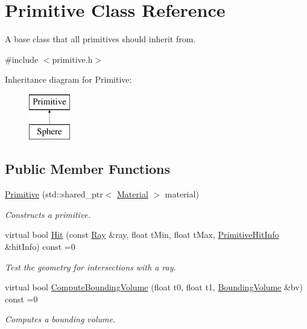 \hypertarget{class_primitive}{}\section{Primitive Class Reference}
\label{class_primitive}


A base class that all primitives should inherit from.  




{\ttfamily \#include $<$primitive.\+h$>$}

Inheritance diagram for Primitive\+:\begin{figure}[H]
\begin{center}
\leavevmode
\includegraphics[height=2.000000cm]{class_primitive}
\end{center}
\end{figure}
\subsection*{Public Member Functions}
\begin{DoxyCompactItemize}
\item 
\mbox{\hyperlink{class_primitive_ad3472a19a06d276e0f0a52ba96b8928b}{Primitive}} (std\+::shared\+\_\+ptr$<$ \mbox{\hyperlink{class_material}{Material}} $>$ material)
\begin{DoxyCompactList}\small\item\em Constructs a primitive. \end{DoxyCompactList}\item 
virtual bool \mbox{\hyperlink{class_primitive_a9a9dff3376d27201ee2fb984f03cb3bc}{Hit}} (const \mbox{\hyperlink{class_ray}{Ray}} \&ray, float t\+Min, float t\+Max, \mbox{\hyperlink{struct_primitive_hit_info}{Primitive\+Hit\+Info}} \&hit\+Info) const =0
\begin{DoxyCompactList}\small\item\em Test the geometry for intersections with a ray. \end{DoxyCompactList}\item 
virtual bool \mbox{\hyperlink{class_primitive_aa69e801685785a9ffdb7653013bf2775}{Compute\+Bounding\+Volume}} (float t0, float t1, \mbox{\hyperlink{class_bounding_volume}{Bounding\+Volume}} \&bv) const =0
\begin{DoxyCompactList}\small\item\em Computes a bounding volume. \end{DoxyCompactList}\end{DoxyCompactItemize}

